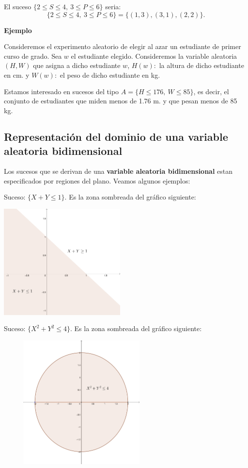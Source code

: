 \documentclass[
  letterpaper,
  DIV=11,
  numbers=noendperiod]{scrreprt}
\begin{document}
El suceso \(\{2\leq S\leq 4,\ 3\leq P\leq 6\}\) seria: \[
\{2\leq S\leq 4,\ 3\leq P\leq 6\} = \{(1,3),(3,1),(2,2)\}.
\]

\textbf{Ejemplo}

Consideremos el experimento aleatorio de elegir al azar un estudiante de
primer curso de grado. Sea \(w\) el estudiante elegido. Consideremos la
variable aleatoria \((H,W)\) que asigna a dicho estudiante \(w\),
\(H(w):\) la altura de dicho estudiante en cm. y \(W(w):\) el peso de
dicho estudiante en kg.

Estamos interesado en sucesos del tipo \(A=\{H\leq 176,\ W\leq 85\}\),
es decir, el conjunto de estudiantes que miden menos de 1.76 m. y que
pesan menos de 85 kg.

\hypertarget{representaciuxf3n-del-dominio-de-una-variable-aleatoria-bidimensional}{%
\subsection{Representación del dominio de una variable aleatoria
bidimensional}\label{representaciuxf3n-del-dominio-de-una-variable-aleatoria-bidimensional}}

Los sucesos que se derivan de una \textbf{variable aleatoria
bidimensional} estan especificados por regiones del plano. Veamos
algunos ejemplos:

Suceso: \(\{X+Y\leq 1\}\). Es la zona sombreada del gráfico siguiente:

\includegraphics[width=2.5in,height=\textheight]{Images/Bidim1.png}

Suceso: \(\{X^2+Y^2\leq 4\}\). Es la zona sombreada del gráfico
siguiente:

\begin{figure}

{\centering \includegraphics[width=2.5in,height=\textheight]{Images/Bidim2.png}

}

\end{figure}
\end{document}
